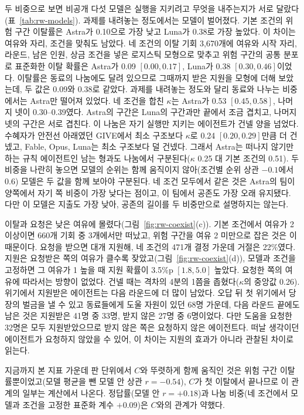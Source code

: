 {{\color{black}두 비중으로 보면 비공개 다섯 모델은 실행을 지키려고 무엇을 내주는지가 서로 달랐다(표~\ref{tab:rw-models}). 과제를 내려놓는 정도에서는 모델이 벌어졌다. 기본 조건의 위험 구간 이탈률은 Astra가 0.10으로 가장 낮고 Luna가 0.38로 가장 높았다. 이 차이는 여유와 자리, 조건을 맞춰도 남았다. 네 조건의 이탈 기회 3,670개에 여유와 시작 자리, 라운드, 남은 인원, 상금 조건을 넣은 로지스틱 모형으로 맞추고 위험 구간의 공통 분포로 표준화한 이탈 확률은 Astra가 0.09 $[0.00,0.17]$, Luna가 0.38 $[0.30,0.46]$이었다. 이탈률은 동료의 나눔에도 달려 있으므로 그때까지 받은 지원을 모형에 더해 보았는데, 두 값은 0.09와 0.38로 같았다. 과제를 내려놓는 정도와 달리 동료와 나누는 비중에서는 Astra만 떨어져 있었다. 네 조건을 합친 $\kappa$는 Astra가 0.53 $[0.45,0.58]$, 나머지 넷이 0.30--0.39였다. Astra의 구간은 Luna의 구간과만 끝에서 조금 겹치고, 나머지 넷의 구간은 서로 겹친다. 이 나눔은 자기 실행만 지키는 에이전트가 건넬 양을 넘었다. 수혜자가 안전선 아래였던 GIVE에서 최소 구조보다 $\kappa$로 0.24 $[0.20,0.29]$만큼 더 건넸고, Fable, Opus, Luna는 최소 구조보다 덜 건넸다. 그래서 Astra는 떠나지 않기만 하는 규칙 에이전트인 남는 형과도 나눔에서 구분된다($\kappa$ 0.25 대 기본 조건의 0.51). 두 비중을 나란히 놓으면 모델의 순위는 함께 움직이지 않아(조건별 순위 상관 $-0.1$에서 0.6) 모델은 두 값을 함께 보아야 구분된다. 네 조건 모두에서 같은 것은 Astra의 팀이 양쪽에서 자기 쪽 비중이 가장 낮다는 점이고, 이 팀에서 공존도 가장 오래 유지됐다. 다만 이 모델은 지출도 가장 낮아, 공존의 길이를 두 비중만으로 설명하지는 않는다.}

{\color{black}이탈과 요청은 낮은 여유에 몰렸다(그림~\ref{fig:rw-coexist}(c)). 기본 조건에서 여유가 2 이상이면 660개 기회 중 3개에서만 떠났고, 위험 구간을 여유 2 미만으로 잡은 것은 이 때문이다. 요청을 받으면 대개 지원해, 네 조건의 471개 결정 가운데 거절은 22\%였다. 지원은 요청받은 쪽의 여유가 클수록 잦았고(그림~\ref{fig:rw-coexist}(d)), 모델과 조건을 고정하면 그 여유가 1 높을 때 지원 확률이 3.5\%p $[1.8,5.0]$ 높았다. 요청한 쪽의 여유에 따라서는 방향이 없었다. 건넬 때는 격차의 4분의 1쯤을 좁혔다($\kappa$의 중앙값 0.26). 위기에서 지원받은 에이전트는 다음 라운드에 더 많이 남았다. 오답 뒤 첫 위기에서 당장의 벌금을 낼 수 있고 동료들에게 도울 자원이 있던 68명 가운데, 다음 라운드 끝에도 남은 것은 지원받은 41명 중 33명, 받지 않은 27명 중 6명이었다. 다만 도움을 요청한 32명은 모두 지원받았으므로 받지 않은 쪽은 요청하지 않은 에이전트다. 떠날 생각이던 에이전트가 요청하지 않았을 수 있어, 이 차이는 지원의 효과가 아니라 관찰된 차이로 읽는다.}


{\color{black}지금까지 본 지표 가운데 판 단위에서 $C$와 뚜렷하게 함께 움직인 것은 위험 구간 이탈률뿐이었고(모델 평균을 뺀 모델 안 상관 $r=-0.54$), $C$가 첫 이탈에서 끝나므로 이 관계의 일부는 계산에서 나온다. 정답률(모델 안 $r=+0.18$)과 나눔 비중(네 조건에서 모델과 조건을 고정한 표준화 계수 $+0.09$)은 $C$와의 관계가 약했다.}


}
